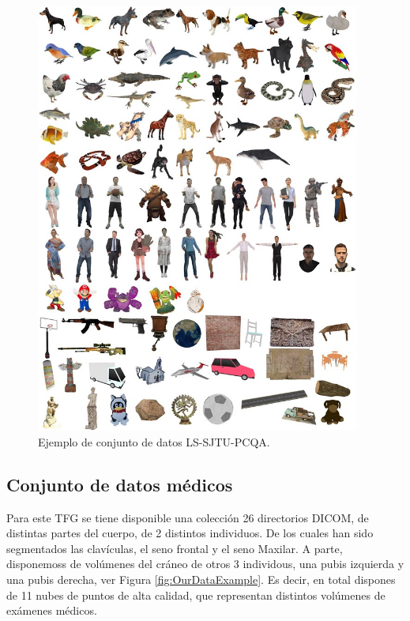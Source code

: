 \begin{figure}
  \begin{center}
    \includegraphics[width=0.95\textwidth]{imagenes/chapter4/LSPCQA}
  \end{center}
  \caption{Ejemplo de conjunto de datos LS-SJTU-PCQA\cite{ResSCNN}.}
  \label{fig:LS-SJTU-PCQA}
\end{figure}

\subsection{Conjunto de datos médicos}
\label{sec:OurData}
Para este TFG se tiene disponible una colección 26 directorios DICOM, de distintas
partes del cuerpo, de 2 distintos individuos. 
De los cuales han sido segmentados las clavículas, el seno frontal y el seno Maxilar. 
A parte, disponemoss de volúmenes del cráneo de otros 3 individous, una pubis izquierda y
una pubis derecha, ver Figura \ref{fig:OurDataExample}. Es decir, en total dispones de 11 nubes de puntos de alta 
calidad, que representan distintos volúmenes de exámenes médicos.

